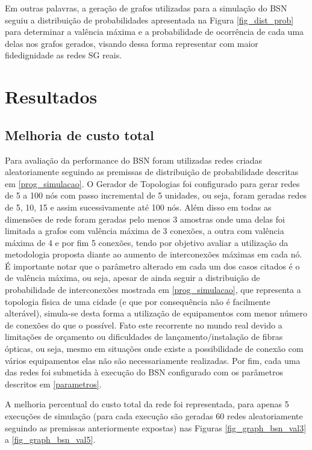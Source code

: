 Em outras palavras, a geração de grafos utilizadas para a simulação do BSN seguiu a distribuição de probabilidades apresentada na Figura \ref{fig_dist_prob} para determinar a valência máxima e a probabilidade de ocorrência de cada uma delas nos grafos gerados, visando dessa forma representar com maior fidedignidade as redes SG reais.

\section{Resultados}
\label{resultados}
\subsection{Melhoria de custo total}
\label{melhoria-custo-total}
Para avaliação da performance do BSN foram utilizadas redes criadas aleatoriamente seguindo as premissas de distribuição de probabilidade descritas em \ref{prog_simulacao}. O Gerador de Topologias foi configurado para gerar redes de 5 a 100 nós com passo incremental de 5 unidades, ou seja, foram geradas redes de 5, 10, 15 e assim sucessivamente até 100 nós. Além disso em todas as dimensões de rede foram geradas pelo menos 3 amostras onde uma delas foi limitada a grafos com valência máxima de 3 conexões, a outra com valência máxima de 4 e por fim 5 conexões, tendo por objetivo avaliar a utilização da metodologia proposta diante ao aumento de interconexões máximas em cada nó. É importante notar que o parâmetro alterado em cada um dos casos citados é o de valência máxima, ou seja, apesar de ainda seguir a distribuição de probabilidade de interconexões mostrada em \ref{prog_simulacao}, que representa a topologia física de uma cidade (e que por consequência não é facilmente alterável), simula-se desta forma a utilização de equipamentos com menor número de conexões do que o possível. Fato este recorrente no mundo real devido a limitações de orçamento ou dificuldades de lançamento/instalação de fibras ópticas, ou seja, mesmo em situações onde existe a possibilidade de conexão com vários equipamentos elas não são necessariamente realizadas. Por fim, cada uma das redes foi submetida à execução do BSN configurado com os parâmetros descritos em \ref{parametros}.

A melhoria percentual do custo total da rede foi representada, para apenas 5 execuções de simulação (para cada execução são geradas 60 redes aleatoriamente seguindo as premissas anteriormente expostas) nas Figuras \ref{fig_graph_bsn_val3} a \ref{fig_graph_bsn_val5}.

